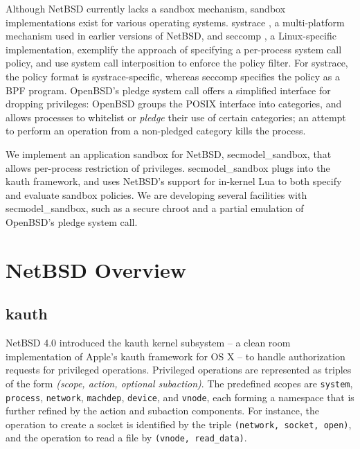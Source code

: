 \documentclass[letterpaper,twocolumn,9pt]{article}
\begin{document}
Although NetBSD currently lacks a sandbox mechanism, sandbox implementations
exist for various operating systems.  systrace \cite{SystracePaper}, a
multi-platform mechanism used in earlier versions of NetBSD, and
seccomp \cite{SeccompOverview}, a Linux-specific implementation,
exemplify the approach of specifying a per-process system call policy, and use
system call interposition to enforce the policy filter.  For systrace, the
policy format is systrace-specific, whereas seccomp specifies the policy as a
BPF program.  OpenBSD's pledge system call \cite{PledgeManpage} offers a
simplified interface for dropping privileges: OpenBSD groups the POSIX
interface into categories, and allows processes to whitelist or \emph{pledge}
their use of certain categories; an attempt to perform an operation from a
non-pledged category kills the process.  

We implement an application sandbox for NetBSD, secmodel\_sandbox, that allows
per-process restriction of privileges.  secmodel\_sandbox plugs into the kauth
framework, and uses NetBSD's support for in-kernel Lua
\cite{ScriptableOperatingSystems} to both specify and evaluate sandbox
policies.  We are developing several facilities with secmodel\_sandbox, such as
a secure chroot and a partial emulation of OpenBSD's pledge system call.

\section{NetBSD Overview} 

\subsection{kauth}
NetBSD 4.0 introduced the kauth kernel subsystem
\cite{NetBSDSecurityEnhancements} -- a clean room implementation of Apple's
kauth framework \cite{MacKauth} for OS X -- to handle authorization requests
for privileged operations.  Privileged operations are represented as triples of
the form \emph{(scope, action, optional subaction)}.  The predefined scopes are
\texttt{system}, \texttt{process}, \texttt{network}, \texttt{machdep},
\texttt{device}, and \texttt{vnode}, each forming a namespace that is further
refined by the action and subaction components.  For instance, the operation
to create a socket is identified by the triple \texttt{(network, socket,
open)}, and the operation to read a file by \texttt{(vnode, read\_data)}.   
\end{document}
